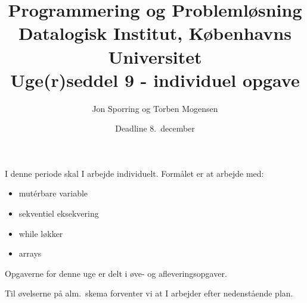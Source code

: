 \documentclass[a4paper,12pt]{article}
\title{Programmering og Problemløsning\\Datalogisk Institut,
  Københavns Universitet\\Uge(r)seddel 9 - individuel opgave}
\author{Jon Sporring og Torben Mogensen}
\date{Deadline  8.\ december}
\begin{document}
\maketitle

I denne periode skal I arbejde individuelt. Formålet er at arbejde med:
\begin{itemize}
\item mut\'{e}rbare variable
\item sekventiel eksekvering
\item while løkker
\item arrays
\end{itemize}

Opgaverne for denne uge er delt i øve- og afleveringsopgaver. 

Til øvelserne på alm.\ skema forventer vi at I arbejder efter nedenstående plan.
\end{document}

